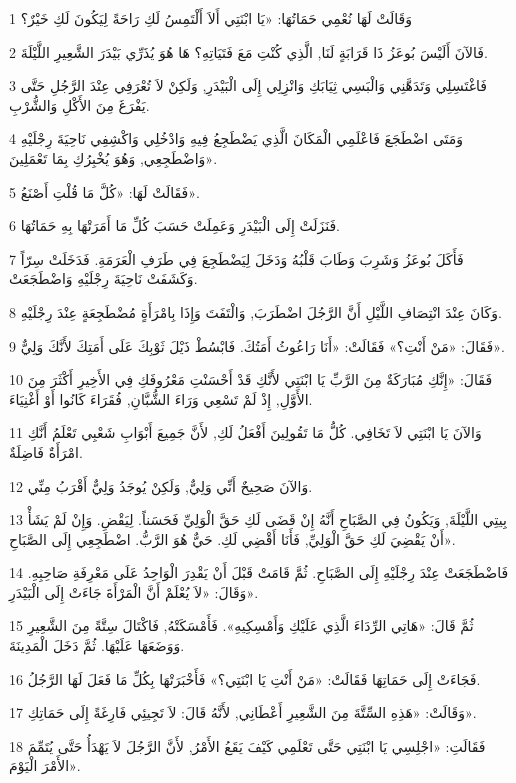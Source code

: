 \par 1 وَقَالَتْ لَهَا نُعْمِي حَمَاتُهَا: «يَا ابْنَتِي أَلاَ أَلْتَمِسُ لَكِ رَاحَةً لِيَكُونَ لَكِ خَيْرٌ؟
\par 2 فَالآنَ أَلَيْسَ بُوعَزُ ذَا قَرَابَةٍ لَنَا, الَّذِي كُنْتِ مَعَ فَتَيَاتِهِ؟ هَا هُوَ يُذَرِّي بَيْدَرَ الشَّعِيرِ اللَّيْلَةَ.
\par 3 فَاغْتَسِلِي وَتَدَهَّنِي وَالْبَسِي ثِيَابَكِ وَانْزِلِي إِلَى الْبَيْدَرِ, وَلَكِنْ لاَ تُعْرَفِي عِنْدَ الرَّجُلِ حَتَّى يَفْرَغَ مِنَ الأَكْلِ وَالشُّرْبِ.
\par 4 وَمَتَى اضْطَجَعَ فَاعْلَمِي الْمَكَانَ الَّذِي يَضْطَجِعُ فِيهِ وَادْخُلِي وَاكْشِفِي نَاحِيَةَ رِجْلَيْهِ وَاضْطَجِعِي, وَهُوَ يُخْبِرُكِ بِمَا تَعْمَلِينَ».
\par 5 فَقَالَتْ لَهَا: «كُلَّ مَا قُلْتِ أَصْنَعُ».
\par 6 فَنَزَلَتْ إِلَى الْبَيْدَرِ وَعَمِلَتْ حَسَبَ كُلِّ مَا أَمَرَتْهَا بِهِ حَمَاتُهَا.
\par 7 فَأَكَلَ بُوعَزُ وَشَرِبَ وَطَابَ قَلْبُهُ وَدَخَلَ لِيَضْطَجِعَ فِي طَرَفِ الْعَرَمَةِ. فَدَخَلَتْ سِرّاً وَكَشَفَتْ نَاحِيَةَ رِجْلَيْهِ وَاضْطَجَعَتْ.
\par 8 وَكَانَ عِنْدَ انْتِصَافِ اللَّيْلِ أَنَّ الرَّجُلَ اضْطَرَبَ, وَالْتَفَتَ وَإِذَا بِامْرَأَةٍ مُضْطَجِعَةٍ عِنْدَ رِجْلَيْهِ.
\par 9 فَقَالَ: «مَنْ أَنْتِ؟» فَقَالَتْ: «أَنَا رَاعُوثُ أَمَتُكَ. فَابْسُطْ ذَيْلَ ثَوْبِكَ عَلَى أَمَتِكَ لأَنَّكَ وَلِيٌّ».
\par 10 فَقَالَ: «إِنَّكِ مُبَارَكَةٌ مِنَ الرَّبِّ يَا ابْنَتِي لأَنَّكِ قَدْ أَحْسَنْتِ مَعْرُوفَكِ فِي الأَخِيرِ أَكْثَرَ مِنَ الأَوَّلِ, إِذْ لَمْ تَسْعِي وَرَاءَ الشُّبَّانِ, فُقَرَاءَ كَانُوا أَوْ أَغْنِيَاءَ.
\par 11 وَالآنَ يَا ابْنَتِي لاَ تَخَافِي. كُلُّ مَا تَقُولِينَ أَفْعَلُ لَكِ, لأَنَّ جَمِيعَ أَبْوَابِ شَعْبِي تَعْلَمُ أَنَّكِ امْرَأَةٌ فَاضِلَةٌ.
\par 12 وَالآنَ صَحِيحٌ أَنِّي وَلِيٌّ, وَلَكِنْ يُوجَدُ وَلِيٌّ أَقْرَبُ مِنِّي.
\par 13 بِيتِي اللَّيْلَةَ, وَيَكُونُ فِي الصَّبَاحِ أَنَّهُ إِنْ قَضَى لَكِ حَقَّ الْوَلِيِّ فَحَسَناً. لِيَقْضِ. وَإِنْ لَمْ يَشَأْ أَنْ يَقْضِيَ لَكِ حَقَّ الْوَلِيِّ, فَأَنَا أَقْضِي لَكِ. حَيٌّ هُوَ الرَّبُّ. اضْطَجِعِي إِلَى الصَّبَاحِ».
\par 14 فَاضْطَجَعَتْ عِنْدَ رِجْلَيْهِ إِلَى الصَّبَاحِ. ثُمَّ قَامَتْ قَبْلَ أَنْ يَقْدِرَ الْوَاحِدُ عَلَى مَعْرِفَةِ صَاحِبِهِ. وَقَالَ: «لاَ يُعْلَمْ أَنَّ الْمَرْأَةَ جَاءَتْ إِلَى الْبَيْدَرِ».
\par 15 ثُمَّ قَالَ: «هَاتِي الرِّدَاءَ الَّذِي عَلَيْكِ وَأَمْسِكِيهِ». فَأَمْسَكَتْهُ, فَاكْتَالَ سِتَّةً مِنَ الشَّعِيرِ وَوَضَعَهَا عَلَيْهَا. ثُمَّ دَخَلَ الْمَدِينَةَ.
\par 16 فَجَاءَتْ إِلَى حَمَاتِهَا فَقَالَتْ: «مَنْ أَنْتِ يَا ابْنَتِي؟» فَأَخْبَرَتْهَا بِكُلِّ مَا فَعَلَ لَهَا الرَّجُلُ.
\par 17 وَقَالَتْ: «هَذِهِ السِّتَّةَ مِنَ الشَّعِيرِ أَعْطَانِي, لأَنَّهُ قَالَ: لاَ تَجِيئِي فَارِغَةً إِلَى حَمَاتِكِ».
\par 18 فَقَالَتِ: «اجْلِسِي يَا ابْنَتِي حَتَّى تَعْلَمِي كَيْفَ يَقَعُ الأَمْرُ, لأَنَّ الرَّجُلَ لاَ يَهْدَأُ حَتَّى يُتَمِّمَ الأَمْرَ الْيَوْمَ».

